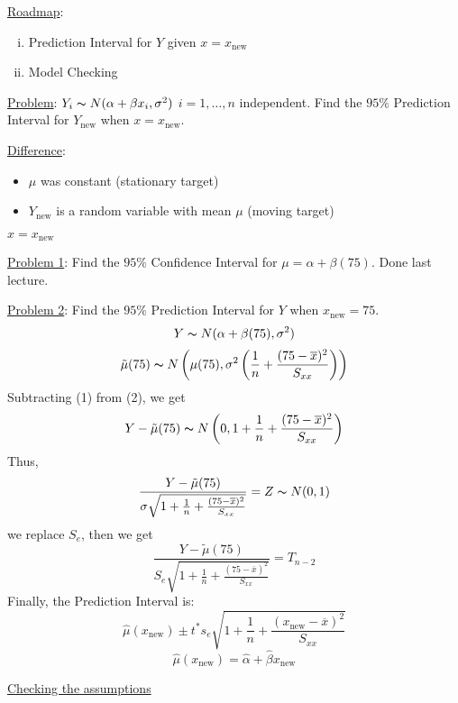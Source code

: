 \underline{Roadmap}:
\begin{enumerate}[(i)]
    \item Prediction Interval for $ Y $ given $ x=x_{\text{new}} $
    \item Model Checking
\end{enumerate}
\underline{Problem}: $ Y_i \thicksim N(\alpha+\beta x_i,\sigma^2) $
$ i=1,\ldots ,n $ independent. Find the $ 95\% $ Prediction Interval
for $ Y_{\text{new}} $ when $ x=x_{\text{new}} $.

\underline{Difference}:
\begin{itemize}
    \item $ \mu $ was constant (stationary target)
    \item $ Y_{\text{new}} $ is a random variable with mean $ \mu $
          (moving target)
\end{itemize}

\begin{exbox}
    \begin{example}
        $ x=x_{\text{new}} $

        \underline{Problem 1}: Find the $ 95\% $ Confidence Interval for
        $ \mu=\alpha+\beta(75) $. Done last lecture.

        \underline{Problem 2}: Find the $ 95\% $ Prediction Interval for
        $ Y $ when $ x_{\text{new}}=75 $.
        \begin{equation}
            Y \thicksim N(\alpha+\beta(75),\sigma^2)
        \end{equation}
        \begin{equation}
            \tilde{\mu}(75) \thicksim N
            \left(\mu(75),\sigma^2\left( \frac{1}{n} +
                \frac{(75-\overline{x})^2}{S_{xx}} \right)\right)
        \end{equation}
        Subtracting (1) from (2), we get
        \[ Y-\tilde{\mu}(75) \thicksim N\left( 0,
            1+\frac{1}{n} + \frac{(75-\overline{x})^2}{S_{xx}} \right) \]
        Thus,
        \[ \frac{Y-\tilde{\mu}(75)}
            {\sigma\sqrt{1+\frac{1}{n} + \frac{(75-\overline{x})^2}{S_{xx}}}}=
            Z \thicksim N(0,1)  \]
        we replace $ S_e $, then we get
        \[ \frac{Y-\tilde{\mu}(75)}
            {S_e\sqrt{1+\frac{1}{n} + \frac{(75-\overline{x})^2}{S_{xx}}}}=
            T_{n-2} \]
        Finally, the Prediction Interval is:
        \[ \hat{\mu}(x_{\text{new}})\pm
            t^* s_e
            \sqrt{1+\frac{1}{n} + \frac{(x_{\text{new}}-\overline{x})^2}{S_{xx}}} \]
        \[ \hat{\mu}(x_{\text{new}})=\hat{\alpha}+\hat{\beta}x_{\text{new}} \]
    \end{example}
\end{exbox}
\underline{Checking the assumptions}

